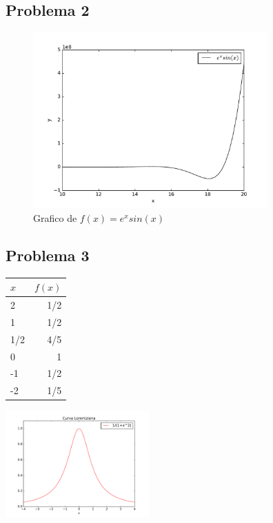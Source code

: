 \documentclass[11pt,spanish,a4paper]{article}
\begin{document}
\break
\subsection{Problema 2}


\begin{figure}[h]
\begin{center}
\includegraphics[width=9cm]{graf.pdf}
\caption{Grafico de $f(x)= e^x sin(x)$ }\label{plot1}
\end{center}
\end{figure}


\subsection{Problema 3}


\begin{table}[h]
\begin{tabular}{l|r}
$x$ & $f(x)$\\\hline\hline
2 & 1/2 \\
1 & 1/2 \\
1/2 & 4/5 \\
0 & 1 \\
-1 & 1/2 \\
-2 & 1/5 \\ \hline
\end{tabular}
\end{table}

\begin{minipage}{0.4\hsize}
\includegraphics[width=5.5cm]{lorentziana.pdf}
\end{minipage}
\end{document}
